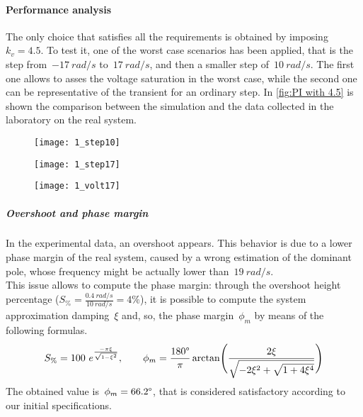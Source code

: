 \paragraph{Performance analysis}
The only choice that satisfies all the requirements is obtained by imposing~$k_v = 4.5$. To test it, one of the worst case scenarios has been applied, that is the step from~$-17\ rad/s$ to~$17\ rad/s$, and then a smaller step of~$10\ rad/s$. The first one allows to asses the voltage saturation in the worst case, while the second one can be representative of the transient for an ordinary step.
In \cref{fig:PI with 4.5} is shown the comparison between the simulation and the data collected in the laboratory on the real system.
\begin{figure*}[h]
	\centering
	\begin{subfigure}{0.45\columnwidth}
		\texttt{[image: 1\_step10]}
	\end{subfigure}
	\begin{subfigure}{0.45\columnwidth}
		\texttt{[image: 1\_step17]}
	\end{subfigure}
	\newline
	\begin{subfigure}{0.45\columnwidth}
		\texttt{[image: 1\_volt17]}
	\end{subfigure}
	\caption{Speed control loop with $k_{v}=4.5$}
	\label{fig:PI with 4.5}
\end{figure*}
\subparagraph{Overshoot and phase margin}
In the experimental data, an overshoot appears. This behavior is due to a lower phase margin of the real system, caused by a wrong estimation of the dominant pole, whose frequency might be actually lower than~$19\ rad/s$. \\
This issue allows to compute the phase margin: through the overshoot height percentage ($S_\% = \frac{0.4\ rad/s}{10\ rad/s} = 4\%$), it is possible to compute the system approximation damping~$\xi$ and, so, the phase margin~$\phi_m$ by means of the following formulas.
\begin{equation}
	S_\% = 100\ e^{\frac{-\pi\xi}{\sqrt{1-\xi^2}}} ,
	\qquad
	\phi_m = \frac{180\degree}{\pi} \arctan \Biggl( \frac{2\xi}{\sqrt{-2\xi^2 + \sqrt{1+4\xi^4} }} \Biggr)
\end{equation}
The obtained value is~$\phi_m = 66.2 \degree$, that is considered satisfactory according to our initial specifications.


